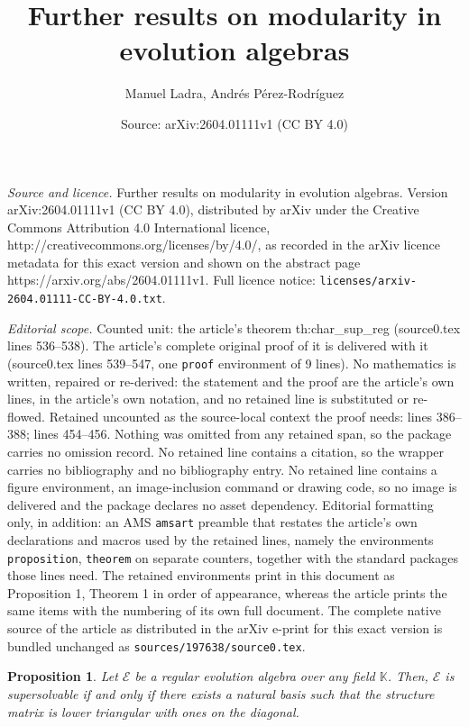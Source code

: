 \documentclass[10pt,a4paper]{amsart}
\title{Further results on modularity in evolution algebras}
\author{Manuel Ladra, Andr\'es P\'erez-Rodr\'iguez}
\date{Source: arXiv:2604.01111v1 (CC BY 4.0)}
\newtheorem{proposition}{Proposition}
\begin{document}
\maketitle

\noindent\emph{Source and licence.} Further results on modularity in evolution algebras. Version arXiv:2604.01111v1 (CC BY 4.0), distributed by arXiv under the Creative Commons Attribution 4.0 International licence, http://creativecommons.org/licenses/by/4.0/, as recorded in the arXiv licence metadata for this exact version and shown on the abstract page https://arxiv.org/abs/2604.01111v1. Full licence notice: \texttt{licenses/arxiv-2604.01111-CC-BY-4.0.txt}.\par\smallskip

\noindent\textit{Editorial scope.} Counted unit: the article's theorem th:char\_sup\_reg (source0.tex lines 536--538). The article's complete original proof of it is delivered with it (source0.tex lines 539--547, one \texttt{proof} environment of 9 lines). No mathematics is written, repaired or re-derived: the statement and the proof are the article's own lines, in the article's own notation, and no retained line is substituted or re-flowed.  Retained uncounted as the source-local context the proof needs: lines 386--388; lines 454--456.  Nothing was omitted from any retained span, so the package carries no omission record.  No retained line contains a citation, so the wrapper carries no bibliography and no bibliography entry.  No retained line contains a figure environment, an image-inclusion command or drawing code, so no image is delivered and the package declares no asset dependency.  Editorial formatting only, in addition: an AMS \texttt{amsart} preamble that restates the article's own declarations and macros used by the retained lines, namely the environments \texttt{proposition}, \texttt{theorem} on separate counters, together with the standard packages those lines need.  The retained environments print in this document as Proposition 1, Theorem 1 in order of appearance, whereas the article prints the same items with the numbering of its own full document.  The complete native source of the article as distributed in the arXiv e-print for this exact version is bundled unchanged as \texttt{sources/197638/source0.tex}.
\begin{proposition}\label{prop:super_triangular}
Let $\mathcal{E}$ be a regular evolution algebra over any field $\mathbb{K}$. Then, $\mathcal{E}$ is supersolvable if and only if there exists a natural basis such that the structure matrix is lower triangular with ones on the diagonal.
\end{proposition}
\end{document}
